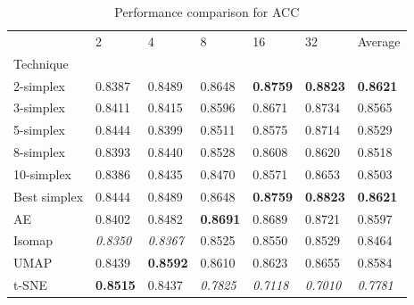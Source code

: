 \begin{table}
\caption{Performance comparison for ACC}
\label{tab:results_acc}
\begin{center}
\begin{tabular}{lllllll}
\toprule
 & 2 & 4 & 8 & 16 & 32 & Average \\
Technique &  &  &  &  &  &  \\
\midrule
2-simplex & 0.8387 & 0.8489 & 0.8648 & \textbf{0.8759} & \textbf{0.8823} & \textbf{0.8621} \\
3-simplex & 0.8411 & 0.8415 & 0.8596 & 0.8671 & 0.8734 & 0.8565 \\
5-simplex & 0.8444 & 0.8399 & 0.8511 & 0.8575 & 0.8714 & 0.8529 \\
8-simplex & 0.8393 & 0.8440 & 0.8528 & 0.8608 & 0.8620 & 0.8518 \\
10-simplex & 0.8386 & 0.8435 & 0.8470 & 0.8571 & 0.8653 & 0.8503 \\
Best simplex & 0.8444 & 0.8489 & 0.8648 & \textbf{0.8759} & \textbf{0.8823} & \textbf{0.8621} \\
AE & 0.8402 & 0.8482 & \textbf{0.8691} & 0.8689 & 0.8721 & 0.8597 \\
Isomap & \textit{0.8350} & \textit{0.8367} & 0.8525 & 0.8550 & 0.8529 & 0.8464 \\
UMAP & 0.8439 & \textbf{0.8592} & 0.8610 & 0.8623 & 0.8655 & 0.8584 \\
t-SNE & \textbf{0.8515} & 0.8437 & \textit{0.7825} & \textit{0.7118} & \textit{0.7010} & \textit{0.7781} \\
\bottomrule
\end{tabular}
\end{center}
\end{table}


